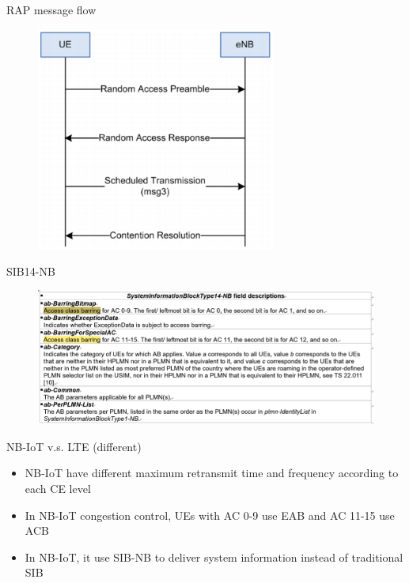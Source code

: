 \documentclass{beamer}
\begin{document}
\begin{frame} {RAP message flow \cite{whitepaper}}  
    \begin{figure}[t]
    \centering
    \includegraphics[width=0.7\textwidth]{figures/rapFlow.png}
    \end{figure}
\end{frame}

\begin{frame} {SIB14-NB \cite{spec}} 
    \begin{figure}[t]
    \centering
    \includegraphics[width=1\textwidth]{figures/SIB14-NB.png}
    \end{figure}
\end{frame}

\begin{frame}{NB-IoT v.s. LTE (different)}
    \begin{itemize}
        \item {NB-IoT have different maximum retransmit time and frequency according to each CE level}
        \item {In NB-IoT congestion control, UEs with AC 0-9 use EAB and AC 11-15 use ACB}
        \item {In NB-IoT, it use SIB-NB to deliver system information instead of traditional SIB}
    \end{itemize}
\end{frame}
\end{document}
